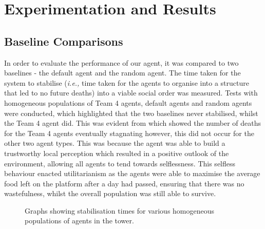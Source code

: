 \section{Experimentation and Results}

\subsection{Baseline Comparisons}
In order to evaluate the performance of our agent, it was compared to two baselines - the default agent and the random agent. The time taken for the system to stabilise (\emph{i.e.,} time taken for the agents to organise into a structure that led to no future deaths) into a viable social order was measured. Tests with homogeneous populations of Team 4 agents, default agents and random agents were conducted, which highlighted that the two baselines never stabilised, whilst the Team 4 agent did. This was evident from  which showed the number of deaths for the Team 4 agents eventually stagnating however, this did not occur for the other two agent types. This was because the agent was able to build a trustworthy local perception which resulted in a positive outlook of the environment, allowing all agents to tend towards selflessness. This selfless behaviour enacted utilitarianism as the agents were able to maximise the average food left on the platform after a day had passed, ensuring that there was no wastefulness, whilst the overall population was still able to survive. 

\begin{figure}[htb]%
    \centering
    \qquad
    \qquad
    \caption{Graphs showing stabilisation times for various homogeneous populations of agents in the tower.}%
    \label{fig:baselinecomps}%
\end{figure}

